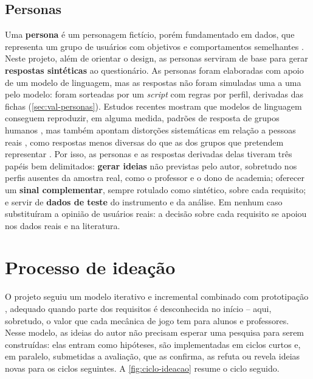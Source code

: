 \subsection{Personas}

Uma \textbf{persona} é um personagem fictício, porém fundamentado em
dados, que representa um grupo de usuários com objetivos e
comportamentos semelhantes \cite{cooper1999,pruitt2006}. Neste projeto,
além de orientar o design, as personas serviram de base para gerar
\textbf{respostas sintéticas} ao questionário. As personas foram
elaboradas com apoio de um modelo de linguagem, mas as respostas não
foram simuladas uma a uma pelo modelo: foram sorteadas por um
\textit{script} com regras por perfil, derivadas das fichas
(\autoref{sec:val-personas}). Estudos recentes mostram que modelos de
linguagem conseguem reproduzir, em alguma medida, padrões de resposta de
grupos humanos \cite{argyle2023}, mas também apontam distorções
sistemáticas em relação a pessoas reais \cite{aher2023}, como respostas
menos diversas do que as dos grupos que pretendem representar
\cite{wang2025}. Por isso, as personas e as respostas derivadas delas
tiveram três papéis bem delimitados: \textbf{gerar ideias} não previstas
pelo autor, sobretudo nos perfis ausentes da amostra real, como o
professor e o dono de academia; oferecer um \textbf{sinal
complementar}, sempre rotulado como sintético, sobre cada requisito; e
servir de \textbf{dados de teste} do instrumento e da análise. Em nenhum
caso substituíram a opinião de usuários reais: a decisão sobre cada
requisito se apoiou nos dados reais e na literatura.

\section{Processo de ideação}
\label{sec:processo-ideacao}

O projeto seguiu um modelo iterativo e incremental combinado com
prototipação \cite{sommerville2019,pressman2021}, adequado quando parte
dos requisitos é desconhecida no início -- aqui, sobretudo, o valor que
cada mecânica de jogo tem para alunos e professores. Nesse modelo, as
ideias do autor não precisam esperar uma pesquisa para serem
construídas: elas entram como hipóteses, são implementadas em ciclos
curtos e, em paralelo, submetidas a avaliação, que as confirma, as
refuta ou revela ideias novas para os ciclos seguintes. A
\autoref{fig:ciclo-ideacao} resume o ciclo seguido.

